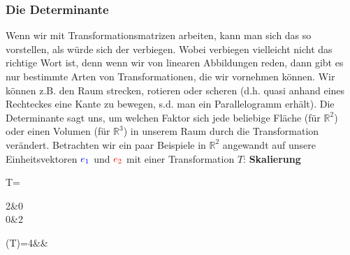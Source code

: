 \documentclass[12pt]{article}
\newcommand{\lb}[0]{\vspace{.5em}\newline}
\begin{document}
		\subsubsection{Die Determinante}
			Wenn wir mit Transformationsmatrizen arbeiten, kann man sich das so vorstellen, als würde sich der verbiegen. Wobei verbiegen vielleicht nicht das richtige Wort ist, denn wenn wir von linearen Abbildungen reden, dann gibt es nur bestimmte Arten von Transformationen, die wir vornehmen können. Wir können z.B. den Raum strecken, rotieren oder scheren (d.h. quasi anhand eines Rechteckes eine Kante zu bewegen, s.d. man ein Parallelogramm erhält).\lb
			Die Determinante sagt uns, um welchen Faktor sich jede beliebige Fläche (für $\mathbb{R}^2$) oder einen Volumen (für $\mathbb{R}^3$) in unserem Raum durch die Transformation verändert.\lb
			Betrachten wir ein paar Beispiele in $\mathbb{R}^2$ angewandt auf unsere Einheitsvektoren $\textcolor{blue}{e_1}$ und $\textcolor{red}{e_2}$ mit einer Transformation $T$:\lb
			\textbf{Skalierung}
			\begin{flalign*}
			T=\begin{pmatrix}
			2&0\\0&2
			\end{pmatrix}\Rightarrow {}(T)=4&&
			\end{flalign*}
\end{document}
